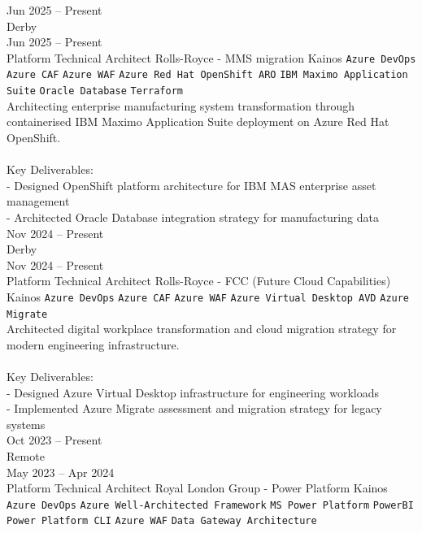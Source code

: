 \documentclass[9pt]{style/developercv}
\begin{document}
\begin{entrylist}
    \entry
    {Jun 2025 -- Present\\\footnotesize{Derby}
    \\Jun 2025  -- Present\\\footnotesize{Platform Technical Architect}}
        {Rolls-Royce - MMS migration}
        {Kainos}
        {
      \texttt{Azure DevOps}\slashsep
      \texttt{Azure CAF}\slashsep
      \texttt{Azure WAF}\slashsep
      \texttt{Azure Red Hat OpenShift ARO}\slashsep
      \texttt{IBM Maximo Application Suite}\slashsep
      \texttt{Oracle Database}\slashsep
      \texttt{Terraform}\\

      Architecting enterprise manufacturing system transformation through containerised IBM Maximo Application Suite deployment on Azure Red Hat OpenShift.\\
      \\
      Key Deliverables:\\
      - Designed OpenShift platform architecture for IBM MAS enterprise asset management\\
      - Architected Oracle Database integration strategy for manufacturing data\\
        }
    \entry
    {Nov 2024 -- Present\\\footnotesize{Derby}
    \\Nov 2024  -- Present\\\footnotesize{Platform Technical Architect}}
        {Rolls-Royce - FCC (Future Cloud Capabilities)}
        {Kainos}
        {
      \texttt{Azure DevOps}\slashsep
      \texttt{Azure CAF}\slashsep
      \texttt{Azure WAF}\slashsep
      \texttt{Azure Virtual Desktop AVD}\slashsep
      \texttt{Azure Migrate}\\

      Architected digital workplace transformation and cloud migration strategy for modern engineering infrastructure.\\
      \\
      Key Deliverables:\\
      - Designed Azure Virtual Desktop infrastructure for engineering workloads\\
      - Implemented Azure Migrate assessment and migration strategy for legacy systems\\
        }
    \entry
    {Oct 2023 -- Present\\\footnotesize{Remote}
    \\May 2023  -- Apr 2024\\\footnotesize{Platform Technical Architect}}
    {Royal London Group - Power Platform}
    {Kainos}
    {
      \texttt{Azure DevOps}\slashsep
      \texttt{Azure Well-Architected Framework}\slashsep
      \texttt{MS Power Platform}\slashsep
      \texttt{PowerBI}\slashsep
      \texttt{Power Platform CLI}\slashsep
      \texttt{Azure WAF}\slashsep
      \texttt{Data Gateway Architecture}\\

}
\end{entrylist}
\end{document}

